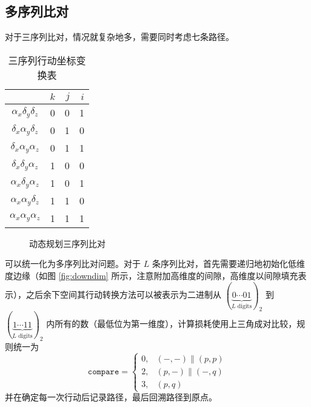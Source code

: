     \subsection{多序列比对}\label{sec:mdp}

    对于三序列比对，情况就复杂地多，需要同时考虑七条路径。

    \begin{minipage}{0.48\textwidth}
        \begin{table}[H]
            \centering
            \caption{三序列行动坐标变换表}\label{tab:multiple}
            \begin{tabular}{crrr}
                \toprule
                    & $k$ & $j$ & $i$ \\
                \midrule
                $\alpha_x\delta_y\delta_z$  & 0 & 0 & 1\\
                $\delta_x\alpha_y\delta_z$ & 0 & 1 & 0 \\
                $\delta_x\alpha_y\alpha_z$ & 0 & 1 & 1 \\
                $\delta_x\delta_y\alpha_z$ & 1 & 0 & 0 \\
                $\alpha_x\delta_y\alpha_z$ & 1 & 0 & 1 \\
                $\alpha_x\alpha_y\delta_z$ & 1 & 1 & 0 \\
                $\alpha_x\alpha_y\alpha_z$ & 1 & 1 & 1 \\
                \bottomrule
            \end{tabular}
        \end{table}
    \end{minipage}\hfil
    \begin{minipage}{0.48\textwidth}
        \begin{figure}[H]
            \centering
            
            \caption{动态规划三序列比对}\label{fig:multipledp}
        \end{figure}
    \end{minipage}
    \medskip

    可以统一化为多序列比对问题。对于 $L$ 条序列比对，首先需要递归地初始化低维度边缘（如图 \ref{fig:downdim} 所示，注意附加高维度的间隙，高维度以间隙填充表示），之后余下空间其行动转换方法可以被表示为二进制从 $(\underbrace{0\cdots01}_{L\text{ digits}})_2$ 到 $(\underbrace{1\cdots11}_{L\text{ digits}})_2$ 内所有的数（最低位为第一维度），计算损耗使用上三角成对比较，规则统一为
    \begin{equation*}
        \texttt{compare}=
        \begin{cases}
            0,& (-,-) \| (p,p) \\
            2,& (p,-) \| (-,q) \\
            3,& (p,q)
        \end{cases}
    \end{equation*}
    并在确定每一次行动后记录路径，最后回溯路径到原点。

